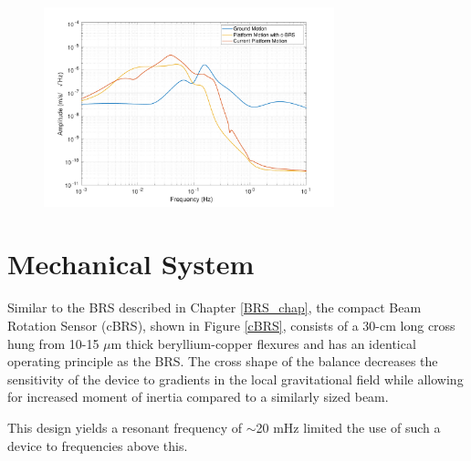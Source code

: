 \documentclass [12pt, proquest]{uwthesis}[2019]
\begin{document}
\begin{figure}%
\begin{center}
\includegraphics[width=0.75\textwidth]{cBRSTranslation.pdf}
\caption{}
\label{cBRST}
\end{center}
\end{figure}

\section{Mechanical System}

Similar to the BRS described in Chapter \ref{BRS_chap}, the compact Beam Rotation Sensor (cBRS), shown in Figure \ref{cBRS}, consists of a 30-cm long cross hung from 10-15 $\mu$m thick beryllium-copper flexures and has an identical operating principle as the BRS. The cross shape of the balance decreases the sensitivity of the device to gradients in the local gravitational field while allowing for increased moment of inertia compared to a similarly sized beam. 

This design yields a resonant frequency of $\sim$20 mHz limited the use of such a device to frequencies above this. 
\end{document}
